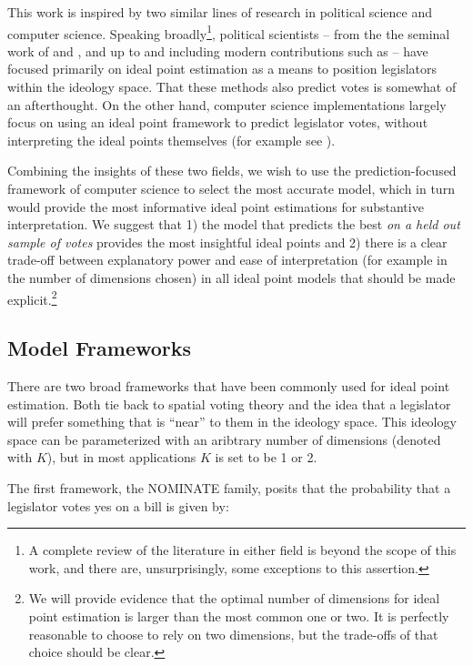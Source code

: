 \documentclass[11pt,]{article}
\begin{document}
This work is inspired by two similar lines of research in political
science and computer science. Speaking broadly\footnote{A complete
  review of the literature in either field is beyond the scope of this
  work, and there are, unsurprisingly, some exceptions to this
  assertion.}, political scientists -- from the the seminal work of
\cite{poole} and \cite{clinton2004statistical}, and up to and including
modern contributions such as \cite{imai2016fast} -- have focused
primarily on ideal point estimation as a means to position legislators
within the ideology space. That these methods also predict votes is
somewhat of an afterthought. On the other hand, computer science
implementations largely focus on using an ideal point framework to
predict legislator votes, without interpreting the ideal points
themselves (for example see \cite{gerrish,kraft}).

Combining the insights of these two fields, we wish to use the
prediction-focused framework of computer science to select the most
accurate model, which in turn would provide the most informative ideal
point estimations for substantive interpretation. We suggest that 1) the
model that predicts the best \emph{on a held out sample of votes}
provides the most insightful ideal points and 2) there is a clear
trade-off between explanatory power and ease of interpretation (for
example in the number of dimensions chosen) in all ideal point models
that should be made explicit.\footnote{We will provide evidence that the
  optimal number of dimensions for ideal point estimation is larger than
  the most common one or two. It is perfectly reasonable to choose to
  rely on two dimensions, but the trade-offs of that choice should be
  clear.}

\subsection{Model Frameworks}\label{model-frameworks}

There are two broad frameworks that have been commonly used for ideal
point estimation. Both tie back to spatial voting theory and the idea
that a legislator will prefer something that is ``near'' to them in the
ideology space. This ideology space can be parameterized with an
aribtrary number of dimensions (denoted with \(K\)), but in most
applications \(K\) is set to be 1 or 2.

The first framework, the NOMINATE family, posits that the probability
that a legislator votes yes on a bill is given by:
\end{document}
